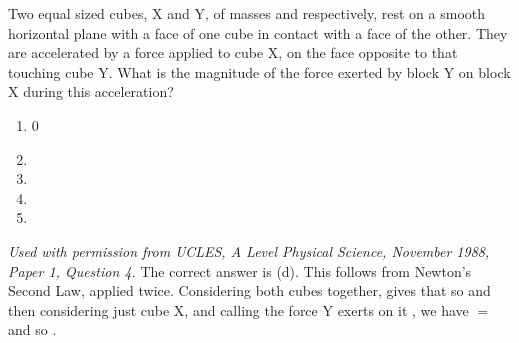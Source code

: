 
\begin{problem}  %
{Two equal sized cubes, X and Y, of masses  and  respectively, rest on a smooth horizontal plane with a face of one cube in contact with a face of the other. They are accelerated by a force  applied to cube X, on the face opposite to that touching cube Y. What is the magnitude of the force exerted by block Y on block X during this acceleration?
\begin{enumerate}
	\item 0
	\item {}
	\item {}
	\item {} \answer
	\item {}
\end{enumerate}
}
{\textit{Used with permission from UCLES, A Level Physical Science, November 1988, Paper 1, Question 4.}}
{The correct answer is (d). This follows from Newton's Second Law, applied twice. Considering both cubes together,  gives that  so  and then considering just cube X, and calling the force Y exerts on it , we have  $=$  and so .}
\end{problem}